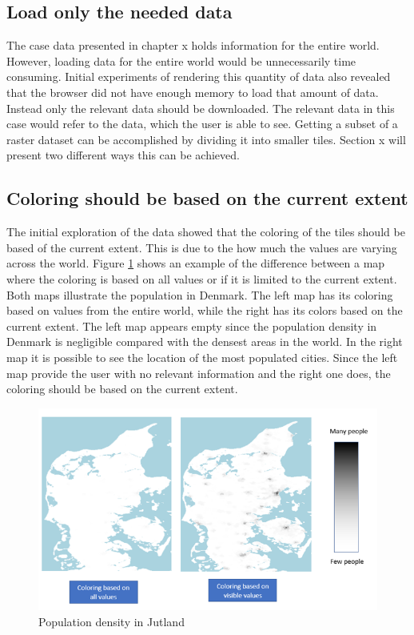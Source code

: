 \subsection{Load only the needed data}
The case data presented in chapter x holds information for the entire world. However, loading data for the entire world would be unnecessarily time consuming. Initial experiments of rendering this quantity of data also revealed that the browser did not have enough memory to load that amount of data. Instead only the relevant data should be downloaded. The relevant data in this case would refer to the data, which the user is able to see. Getting a subset of a raster dataset can be accomplished by dividing it into smaller tiles. Section x will present two different ways this can be achieved. 

\subsection{Coloring should be based on the current extent}
The initial exploration of the data showed that the coloring of the tiles should be based of the current extent. This is due to the how much the values are varying across the world. Figure \ref{WhyLimitToExtent} shows an example of the difference between a map where the coloring is based on all values or if it is limited to the current extent. Both maps illustrate the population in Denmark. The left map has its coloring based on values from the entire world, while the right has its colors based on the current extent. The left map appears empty since the population density in Denmark is negligible compared with the densest areas in the world. In the right map it is possible to see the location of the most populated cities. Since the left map provide the user with no relevant information and the right one does, the coloring should be based on the current extent.


\begin{figure} [H]
	\centering
	\includegraphics[width=.8\textwidth]{Pictures/WhyLimitToExtent}
	\caption{Population density in Jutland}
	\label{WhyLimitToExtent}
\end{figure}




